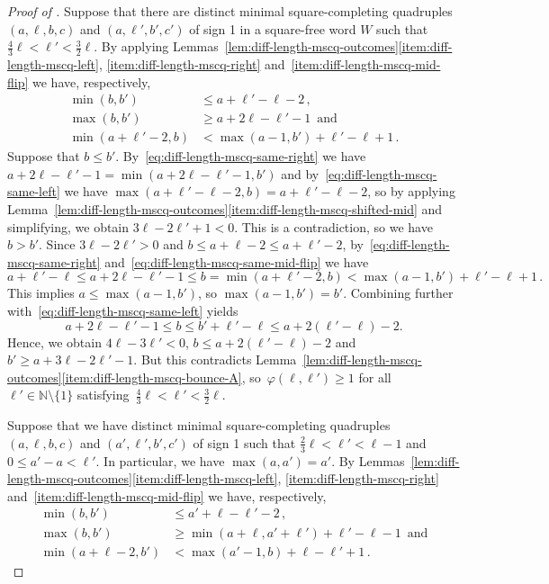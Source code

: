 \documentclass[12pt]{article}
\theoremstyle{plain}
\theoremstyle{definition}
\newcommand\N{\mathbb{N}}
\newcommand{\f}{\varphi}
\newcommand{\sm}{\setminus}
\begin{document}
\begin{proof}[Proof of ]
		Suppose that there are distinct minimal square-completing quadruples $(a,\ell,b,c)$ and $(a,\ell',b',c')$ of sign 1 in a square-free word $W$ such that $\frac{4}{3}\ell<\ell'<\frac{3}{2}\ell$. By applying Lemmas~\ref{lem:diff-length-mscq-outcomes}\ref{item:diff-length-mscq-left}, \ref{item:diff-length-mscq-right} and~\ref{item:diff-length-mscq-mid-flip} we have, respectively,
		\begin{align}
			\min(b,b')&\le a+\ell'-\ell-2\,, \label{eq:diff-length-mscq-same-left} \\
			\max(b,b')&\ge a+2\ell-\ell'-1\,\textrm{ and} \label{eq:diff-length-mscq-same-right} \\
			\min(a+\ell'-2,b) &< \max(a-1,b') + \ell'-\ell+1\,.  \label{eq:diff-length-mscq-same-mid-flip}
		\end{align}
		Suppose that $b\le b'$. By~\eqref{eq:diff-length-mscq-same-right} we have $a+2\ell-\ell'-1 = \min(a+2\ell-\ell'-1,b')$ and by~\eqref{eq:diff-length-mscq-same-left} we have $\max(a+\ell'-\ell-2,b)= a+\ell'-\ell-2$, so by applying Lemma~\ref{lem:diff-length-mscq-outcomes}\ref{item:diff-length-mscq-shifted-mid} and simplifying, we obtain $3\ell-2\ell'+1<0$. This is a contradiction, so we have $b>b'$. Since $3\ell-2\ell'>0$ and $b\le a+\ell-2\le a+\ell'-2$, by~\eqref{eq:diff-length-mscq-same-right} and~\eqref{eq:diff-length-mscq-same-mid-flip} we have 
		\[a+\ell'-\ell\le a+2\ell-\ell'-1\le b=\min(a+\ell'-2,b)<\max(a-1,b') + \ell'-\ell+1\,.\]
		This implies $a\le\max(a-1,b')$, so $\max(a-1,b')=b'$. Combining further with~\eqref{eq:diff-length-mscq-same-left} yields
		\[a+2\ell-\ell'-1\le b\le b'+\ell'-\ell\le a+2(\ell'-\ell)-2.\]
		Hence, we obtain $4\ell-3\ell'<0$, $b\le a+2(\ell'-\ell)-2$ and $b'\ge a+3\ell-2\ell'-1$. But this contradicts Lemma~\ref{lem:diff-length-mscq-outcomes}\ref{item:diff-length-mscq-bounce-A}, so~$\f(\ell,\ell') \ge 1$ for all~$\ell'\in\N\sm\{1\}$ satisfying~$\frac{4}{3}\ell<\ell'<\frac{3}{2}\ell$.
		
		Suppose that we have distinct minimal square-completing quadruples $(a,\ell,b,c)$ and $(a',\ell',b',c')$ of sign 1 such that $\frac{2}{3}\ell<\ell'<\ell-1$ and $0\le a'-a<\ell'$. In particular, we have $\max(a,a')=a'$. By Lemmas~\ref{lem:diff-length-mscq-outcomes}\ref{item:diff-length-mscq-left}, \ref{item:diff-length-mscq-right} and~\ref{item:diff-length-mscq-mid-flip} we have, respectively,
		\begin{align}
			\min(b,b')&\le a'+\ell-\ell'-2\,, \label{eq:diff-length-mscq-left} \\
			\max(b,b')&\ge \min(a+\ell,a'+\ell')+\ell'-\ell-1\,\textrm{ and} \label{eq:diff-length-mscq-right} \\
			\min(a+\ell-2,b') &< \max(a'-1,b) + \ell-\ell'+1\,.  \label{eq:diff-length-mscq-mid-flip}
		\end{align}
		

\end{proof}
\end{document}
